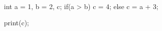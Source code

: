 \begin{minipage}[b]{2in}
\begin{AVerb}[numbers=left]
int a = 1, b = 2, c; \label{lst_back1_assign}
if(a > b) \label{lst_back1_test}
  c = 4; \label{lst_back1_test_true}
else     
  c = a + 3; \label{lst_back1_test_false}

print(c); \label{lst_back1_print}
\end{AVerb}
\end{minipage}

